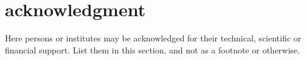 \documentclass[10pt]{style_src/imeko_acta}
\begin{document}

\mbox{}\par


\section*{acknowledgment} 

Here persons or institutes may be acknowledged for their technical, scientific or financial support. List them in this section, and not as a footnote or otherwise. \vspace{12.1cm}



\end{document}

